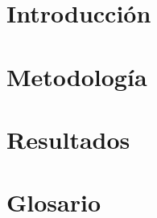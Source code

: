 \documentclass{Articulo_Revista/templateRevistaUPTCCiencias}
\begin{document}
\section{Introducción}
\label{sec:introduccion}


\section{Metodología}
\label{sec:metodologia}


\section{Resultados}
\label{sec:resultados}








\appendix
\section{Glosario}
\label{sec:glosario}

\end{document}
